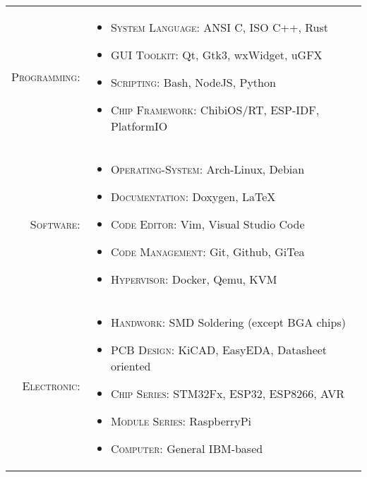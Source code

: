 %
%

\renewcommand{\arraystretch}{1.1}

\begin{tabular}{>{}r>{}p{13cm}}
    \textsc{Programming:} &
        \begin{itemize}
            \item \textsc{System Language:} ANSI C, ISO C++, Rust
            \item \textsc{GUI Toolkit:} Qt, Gtk3, wxWidget, uGFX
            \item \textsc{Scripting:} Bash, NodeJS, Python
            \item \textsc{Chip Framework:} ChibiOS/RT, ESP-IDF, PlatformIO
        \end{itemize} \\

    \textsc{Software:} &
        \begin{itemize}
            \item \textsc{Operating-System:} Arch-Linux, Debian
            \item \textsc{Documentation:} Doxygen, LaTeX
            \item \textsc{Code Editor:} Vim, Visual Studio Code
            \item \textsc{Code Management:} Git, Github, GiTea
            \item \textsc{Hypervisor:} Docker, Qemu, KVM
        \end{itemize} \\

    \textsc{Electronic:} &
        \begin{itemize}
            \item \textsc{Handwork:} SMD Soldering (except BGA chips)
            \item \textsc{PCB Design:} KiCAD, EasyEDA, Datasheet oriented
            \item \textsc{Chip Series:} STM32Fx, ESP32, ESP8266, AVR
            \item \textsc{Module Series:} RaspberryPi
            \item \textsc{Computer:} General IBM-based
        \end{itemize}
\end{tabular}


